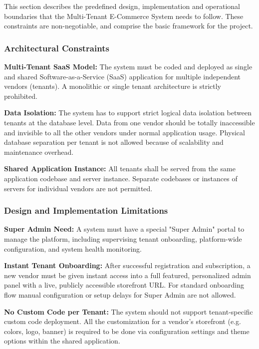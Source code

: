 This section describes the predefined design, implementation and operational boundaries that the Multi-Tenant E-Commerce System needs to follow. These constraints are non-negotiable, and comprise the basic framework for the project.
    \subsubsection{Architectural Constraints}

    \textbf{Multi-Tenant SaaS Model:} The system must be coded and deployed as single and shared Software-as-a-Service (SaaS) application for multiple independent vendors (tenants). A monolithic or single tenant architecture is strictly prohibited.

    \textbf{Data Isolation:} The system has to support strict logical data isolation between tenants at the database level. Data from one vendor should be totally inaccessible and invisible to all the other vendors under normal application usage. Physical database separation per tenant is not allowed because of scalability and maintenance overhead.

    \textbf{Shared Application Instance:} All tenants shall be served from the same application codebase and server instance. Separate codebases or instances of servers for individual vendors are not permitted.


    \subsubsection{Design and Implementation Limitations}

    \textbf{Super Admin Need:} A system must have a special "Super Admin" portal to manage the platform, including supervising tenant onboarding, platform-wide configuration, and system health monitoring.

    \textbf{Instant Tenant Onboarding:} After successful registration and subscription, a new vendor must be given instant access into a full featured, personalized admin panel with a live, publicly accessible storefront URL. For standard onboarding flow manual configuration or setup delays for Super Admin are not allowed.

    \textbf{No Custom Code per Tenant:} The system should not support tenant-specific custom code deployment. All the customization for a vendor's storefront (e.g. colors, logo, banner) is required to be done via configuration settings and theme options within the shared application.
    
